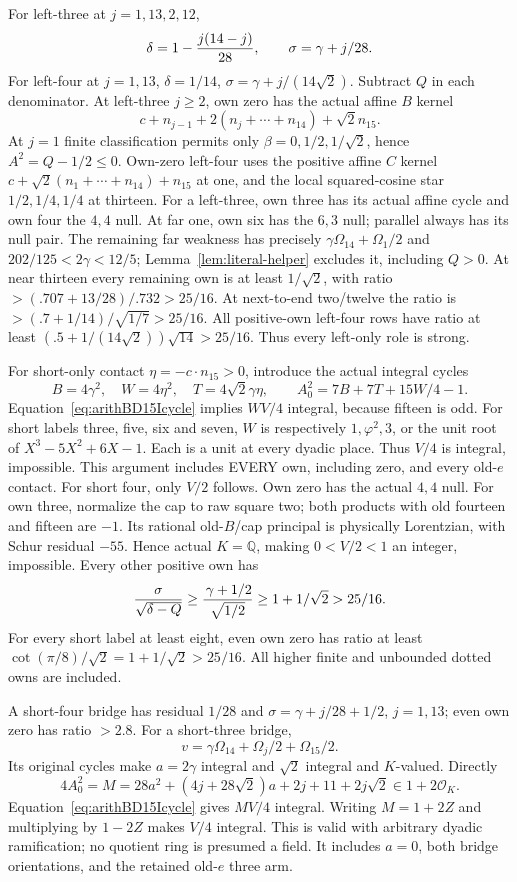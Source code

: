 \documentclass[11pt]{article}
\begin{document}
For left-three at \(j=1,13,2,12\),
\[
              \delta=1-{j(14-j)\over28},\qquad
              \sigma=\gamma+j/28.
\]
For left-four at \(j=1,13\),
\(\delta=1/14\), \(\sigma=\gamma+j/(14\sqrt2)\).
Subtract \(Q\) in each denominator.
At left-three \(j\ge2\), own zero has the actual
affine \(B\) kernel
\[
       c+n_{j-1}+2(n_j+\cdots+n_{14})+\sqrt2n_{15}.
\]
At \(j=1\) finite classification permits only
\(\beta=0,1/2,1/\sqrt2\), hence
\(A^2=Q-1/2\le0\).
Own-zero left-four uses the positive affine \(C\)
kernel
\(c+\sqrt2(n_1+\cdots+n_{14})+n_{15}\) at one,
and the local squared-cosine star
\(1/2,1/4,1/4\) at thirteen.
For a left-three, own three has its actual affine cycle
and own four the \(4,4\) null.
At far one, own six has the \(6,3\) null; parallel
always has its null pair.
The remaining far weakness has precisely
\(\gamma\Omega_{14}+\Omega_1/2\) and
\(202/125<2\gamma<12/5\);
Lemma~\ref{lem:literal-helper} excludes it, including \(Q>0\).
At near thirteen every remaining own is at least
\(1/\sqrt2\), with ratio
\(>(.707+13/28)/.732>25/16\).
At next-to-end two/twelve the ratio is
\(>(.7+1/14)/\sqrt{1/7}>25/16\).
All positive-own left-four rows have ratio at least
\((.5+1/(14\sqrt2))\sqrt{14}>25/16\).
Thus every left-only role is strong.

For short-only contact \(\eta=-c\cdot n_{15}>0\),
introduce the actual integral cycles
\[
 B=4\gamma^2,\quad W=4\eta^2,\quad
 T=4\sqrt2\gamma\eta,\qquad
 A_0^2=7B+7T+15W/4-1.
\]
Equation~\eqref{eq:arithBD15Icycle} implies \(WV/4\)
integral, because fifteen is odd.
For short labels three, five, six and seven,
\(W\) is respectively \(1,\varphi^2,3\), or the unit
root of \(X^3-5X^2+6X-1\).
Each is a unit at every dyadic place.
Thus \(V/4\) is integral, impossible.
This argument includes EVERY own, including zero,
and every old-\(e\) contact.
For short four, only \(V/2\) follows.
Own zero has the actual \(4,4\) null.
For own three, normalize the cap to raw square two;
both products with old fourteen and fifteen are \(-1\).
Its rational old-\(B\)/cap principal is physically
Lorentzian, with Schur residual \(-55\).
Hence actual \(K=\mathbb Q\), making \(0<V/2<1\)
an integer, impossible.
Every other positive own has
\[
 {\sigma\over\sqrt{\delta-Q}}\ge
 {\,\gamma+1/2\over\sqrt{1/2}}\ge1+1/\sqrt2>25/16.
\]
For every short label at least eight, even own zero
has ratio at least
\(\cot(\pi/8)/\sqrt2=1+1/\sqrt2>25/16\).
All higher finite and unbounded dotted owns are included.

A short-four bridge has residual \(1/28\) and
\(\sigma=\gamma+j/28+1/2\), \(j=1,13\);
even own zero has ratio \(>2.8\).
For a short-three bridge,
\[
 v=\gamma\Omega_{14}+\Omega_j/2+\Omega_{15}/2 .
\]
Its original cycles make \(a=2\gamma\) integral
and \(\sqrt2\) integral and \(K\)-valued.
Directly
\[
 4A_0^2=M=28a^2+(4j+28\sqrt2)a+2j+11+2j\sqrt2
             \in1+2\mathcal O_K .
\]
Equation~\eqref{eq:arithBD15Icycle} gives \(MV/4\)
integral.
Writing \(M=1+2Z\) and multiplying by \(1-2Z\)
makes \(V/4\) integral.
This is valid with arbitrary dyadic ramification;
no quotient ring is presumed a field.
It includes \(a=0\), both bridge orientations,
and the retained old-\(e\) three arm.
\end{document}
